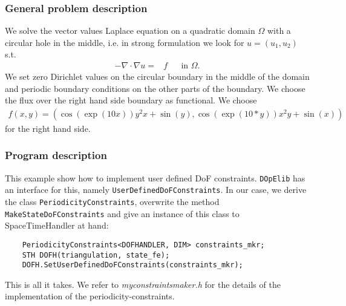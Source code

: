 \subsubsection{General problem description}
We solve the vector values Laplace equation on a quadratic domain $\Omega$ with a circular hole in the middle, i.e. in strong formulation we look for $u=(u_1,u_2)$ s.t.
\begin{align*}
-\nabla \cdot \nabla u =& f &&\text{in }\Omega.
\end{align*}
We set zero Dirichlet values on the circular boundary in the middle of the domain and periodic boundary conditions on the other parts of the boundary. We choose the flux over the right hand side boundary as functional. We choose
\begin{align*}
f(x,y) = \left(\cos\left(\exp(10  x)\right)  y^2x + \sin(y), \cos\left(\exp(10 * y)\right)x^2y + \sin(x)\right)
\end{align*}
for the right hand side.
\subsubsection{Program description}
This example show how to implement user defined DoF constraints. \texttt{DOpElib} has an interface for this, namely \texttt{UserDefinedDoFConstraints}. In our case, we derive the class \texttt{PeriodicityConstraints}, overwrite the method \texttt{MakeStateDoFConstraints} and give an instance of this class to SpaceTimeHandler at hand:
\begin{verbatim}
 	PeriodicityConstraints<DOFHANDLER, DIM> constraints_mkr;
 	STH DOFH(triangulation, state_fe);
 	DOFH.SetUserDefinedDoFConstraints(constraints_mkr);
\end{verbatim}
This is all it takes. We refer to \textit{myconstraintsmaker.h} for the details of the implementation of the periodicity-constraints.
